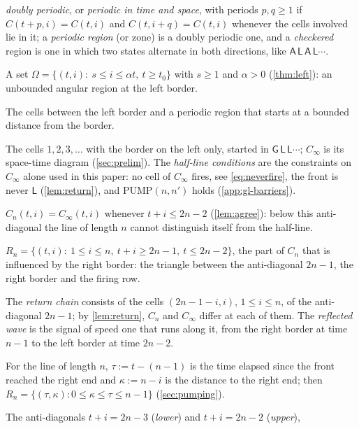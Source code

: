 {\begin{description}[style=unboxed,leftmargin=1em,font=\normalfont\bfseries,itemsep=1pt,parsep=0pt,topsep=2pt]
  \emph{doubly periodic}, or \emph{periodic in time and space}, with
  periods $p,q\ge1$ if $C(t+p,i)=C(t,i)$ and $C(t,i+q)=C(t,i)$ whenever the
  cells involved lie in it; a \emph{periodic region} (or zone) is a doubly
  periodic one, and a \emph{checkered} region is one in which two states
  alternate in both directions, like $\mathsf A\,\mathsf L\,\mathsf
  A\,\mathsf L\cdots$.
\item[Wedge.] A set $\Omega=\{(t,i):\ s\le i\le\alpha t,\ t\ge t_0\}$ with
  $s\ge1$ and $\alpha>0$ (\cref{thm:left}): an unbounded angular region at
  the left border.
\item[Boundary layer.] The cells between the left border and a periodic
  region that starts at a bounded distance from the border.
\item[Half-line; $C_\infty$.] The cells $1,2,3,\dots$ with the border on
  the left only, started in $\mathsf G\,\mathsf L\,\mathsf L\cdots$;
  $C_\infty$ is its space-time diagram (\cref{sec:prelim}). The
  \emph{half-line conditions} are the constraints on $C_\infty$ alone used
  in this paper: no cell of $C_\infty$ fires, see \eqref{eq:neverfire}, the
  front is never $\mathsf L$ (\cref{lem:return}), and $\mathrm{PUMP}(n,n')$
  holds (\cref{app:gl-barriers}).
\item[Agreement.] $C_n(t,i)=C_\infty(t,i)$ whenever $t+i\le2n-2$
  (\cref{lem:agree}): below this anti-diagonal the line of length $n$
  cannot distinguish itself from the half-line.
\item[Reflected triangle $R_n$.]
  $R_n=\{(t,i):\ 1\le i\le n,\ t+i\ge2n-1,\ t\le2n-2\}$, the part of $C_n$
  that is influenced by the right border: the triangle between the
  anti-diagonal $2n-1$, the right border and the firing row.
\item[Return chain; reflected wave.] The \emph{return chain} consists
  of the cells $(2n-1-i,i)$, $1\le i\le n$, of the anti-diagonal $2n-1$;
  by \cref{lem:return}, $C_n$ and $C_\infty$ differ at each of them. The
  \emph{reflected wave} is the signal of speed one that runs along it,
  from the right border at time $n-1$ to the left border at time $2n-2$.
\item[Relative coordinates $(\tau,\kappa)$.] For the line of length $n$,
  $\tau:=t-(n-1)$ is the time elapsed since the front reached the right
  end and $\kappa:=n-i$ is the distance to the right end; then
  $R_n=\{(\tau,\kappa):0\le\kappa\le\tau\le n-1\}$ (\cref{sec:pumping}).
\item[Input anti-diagonals; input cells; input word $J_n$.] The
  anti-diagonals $t+i=2n-3$ (\emph{lower}) and $t+i=2n-2$ (\emph{upper}),

\end{description}}
